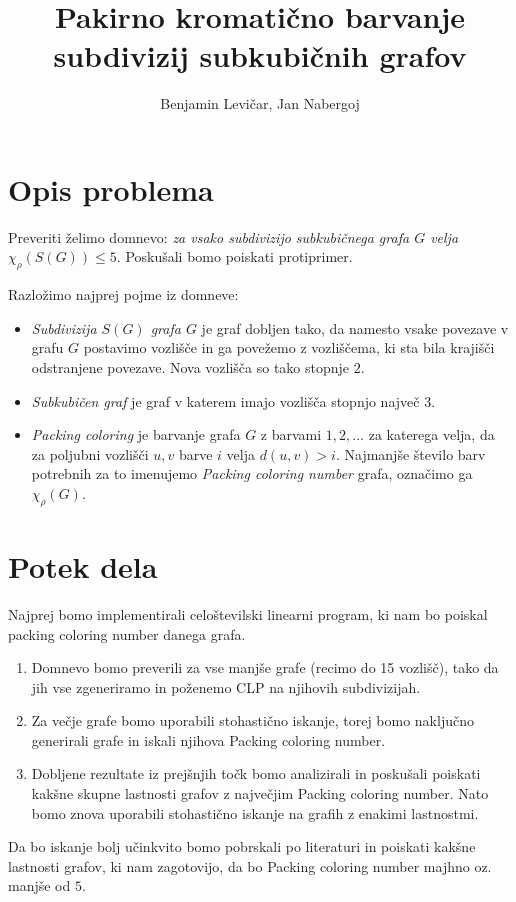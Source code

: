 \documentclass[11pt,a4paper]{article}
\begin{document}
\title{Pakirno kromatično barvanje subdivizij subkubičnih grafov}
\author{Benjamin Levičar, Jan Nabergoj}

\maketitle

\section{Opis problema}

Preveriti  želimo domnevo: \emph{za vsako subdivizijo subkubičnega grafa $G$ velja $\chi_\rho(S(G)) \leq 5$}. Poskušali bomo poiskati protiprimer.

Razložimo najprej pojme iz domneve:
\begin{itemize}
    \item \emph{Subdivizija $S(G)$ grafa $G$} je graf dobljen tako, da namesto vsake povezave v grafu $G$ postavimo vozlišče in ga povežemo z vozliščema,
          ki sta bila krajišči odstranjene povezave. Nova vozlišča so tako stopnje $2$.
    \item \emph{Subkubičen graf} je graf v katerem imajo vozlišča stopnjo največ $3$.
    \item \emph{Packing coloring} je barvanje grafa $G$ z barvami $1, 2, \dots$ za katerega velja, da za poljubni vozlišči $u, v$ barve $i$ velja $d(u, v) > i$.
          Najmanjše število barv potrebnih za to imenujemo \emph{Packing coloring number} grafa, označimo ga $\chi_\rho(G)$.
\end{itemize}


\section{Potek dela}

Najprej bomo implementirali celoštevilski linearni program, ki nam bo poiskal packing coloring number danega grafa. 

\begin{enumerate}
    \item Domnevo bomo preverili za vse manjše grafe (recimo do 15 vozlišč), tako da jih vse zgeneriramo in poženemo CLP na njihovih subdivizijah.
    \item Za večje grafe bomo uporabili stohastično iskanje, torej bomo naključno generirali grafe in iskali njihova Packing coloring number.
    \item Dobljene rezultate iz prejšnjih točk bomo analizirali in poskušali poiskati kakšne skupne lastnosti grafov z največjim Packing coloring
          number. Nato bomo znova uporabili stohastično iskanje na grafih z enakimi lastnostmi.
\end{enumerate}

Da bo iskanje bolj učinkvito bomo pobrskali po literaturi in poiskati kakšne lastnosti grafov, ki nam zagotovijo, da bo Packing coloring number majhno
oz. manjše od $5$.
\end{document}
